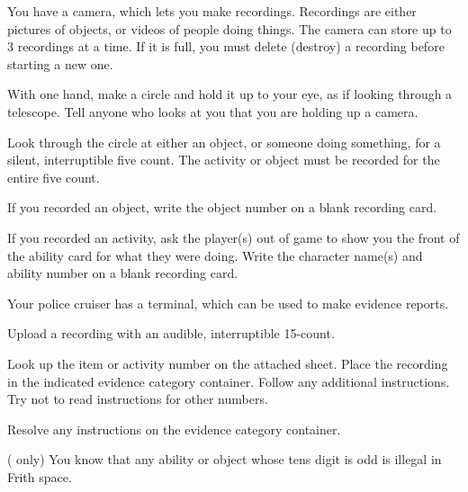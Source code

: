 \documentclass[green]{guildcamp4}
\begin{document}
\name{\gEvidence{}}

You have a camera, which lets you make recordings. Recordings are either pictures of objects, or videos of people doing things. The camera can store up to 3 recordings at a time. If it is full, you must delete (destroy) a recording before starting a new one. 
	
\begin{enum}
    \item With one hand, make a circle and hold it up to your eye, as if looking through a telescope. Tell anyone who looks at you that you are holding up a camera.
    \item Look through the circle at either an object, or someone doing something, for a silent, interruptible five count. The activity or object must be recorded for the entire five count.
    \item If you recorded an object, write the object number on a blank recording card.
    \item If you recorded an activity, ask the player(s) out of game to show you the front of the ability card for what they were doing. Write the character name(s) and ability number on a blank recording card.
\end{enum}
    
Your police cruiser has a terminal, which can be used to make evidence reports.

  	\begin{enum}
      \item Upload a recording with an audible, interruptible 15-count.
      \item Look up the item or activity number on the attached sheet. Place the recording in the indicated evidence category container. Follow any additional instructions. Try not to read instructions for other numbers.
      \item Resolve any instructions on the evidence category container.
    \end{enum}

(\cCgood{} only) You know that any ability or object whose tens digit is odd is illegal in Frith space.
\end{document}
